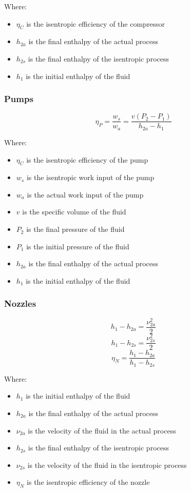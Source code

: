 \documentclass[11pt]{article}
\begin{document}
Where:
\begin{itemize}
\item \(\eta_C\) is the isentropic efficiency of the compressor
\item \(h_{2a}\) is the final enthalpy of the actual process
\item \(h_{2s}\) is the final enthalpy of the isentropic process
\item \(h_1\) is the initial enthalpy of the fluid
\end{itemize}

\subsubsection{Pumps}
\label{sec:org59eaf83}
\[\eta_P = \frac{w_s}{w_a} = \frac{v \left(P_2 - P_1 \right)}{h_{2a} - h_1}\]

Where:
\begin{itemize}
\item \(\eta_C\) is the isentropic efficiency of the pump
\item \(w_s\) is the isentropic work input of the pump
\item \(w_a\) is the actual work input of the pump
\item \(v\) is the specific volume of the fluid
\item \(P_2\) is the final pressure of the fluid
\item \(P_1\) is the initial pressure of the fluid
\item \(h_{2a}\) is the final enthalpy of the actual process
\item \(h_1\) is the initial enthalpy of the fluid
\end{itemize}

\subsubsection{Nozzles}
\label{sec:orgd294273}
\[h_1 - h_{2a} = \frac{\nu^2_{2a}}{2}\]
\[h_1 - h_{2s} = \frac{\nu^2_{2s}}{2}\]
\[\eta_N = \frac{h_1 - h_{2a}}{h_1 - h_{2s}}\]

Where:
\begin{itemize}
\item \(h_1\) is the initial enthalpy of the fluid
\item \(h_{2a}\) is the final enthalpy of the actual process
\item \(\nu_{2a}\) is the velocity of the fluid in the actual process
\item \(h_{2s}\) is the final enthalpy of the isentropic process
\item \(\nu_{2s}\) is the velocity of the fluid in the isentropic process
\item \(\eta_N\) is the isentropic efficiency of the nozzle
\end{itemize}
\end{document}
